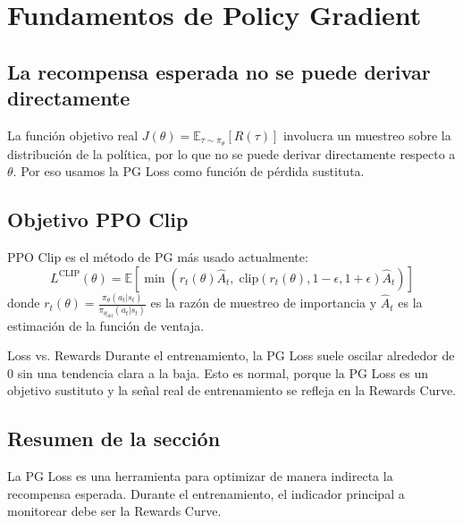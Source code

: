 \section{Fundamentos de Policy Gradient}
\subsection{La recompensa esperada no se puede derivar directamente}
La función objetivo real $J(\theta) = \mathbb{E}_{\tau \sim \pi_\theta}[R(\tau)]$ involucra un muestreo sobre la distribución de la política, por lo que no se puede derivar directamente respecto a $\theta$. Por eso usamos la PG Loss como función de pérdida sustituta.

\subsection{Objetivo PPO Clip}
PPO Clip es el método de PG más usado actualmente:
$$L^{\text{CLIP}}(\theta) = \mathbb{E}\left[\min\left(r_t(\theta) \hat{A}_t, \; \text{clip}(r_t(\theta), 1-\epsilon, 1+\epsilon) \hat{A}_t\right)\right]$$
donde $r_t(\theta) = \frac{\pi_\theta(a_t|s_t)}{\pi_{\theta_{\text{old}}}(a_t|s_t)}$ es la razón de muestreo de importancia y $\hat{A}_t$ es la estimación de la función de ventaja.

\begin{warningbox}{Loss vs. Rewards}
Durante el entrenamiento, la PG Loss suele oscilar alrededor de 0 sin una tendencia clara a la baja. Esto es normal, porque la PG Loss es un objetivo sustituto y la señal real de entrenamiento se refleja en la Rewards Curve.
\end{warningbox}

\subsection{Resumen de la sección}
La PG Loss es una herramienta para optimizar de manera indirecta la recompensa esperada. Durante el entrenamiento, el indicador principal a monitorear debe ser la Rewards Curve.

